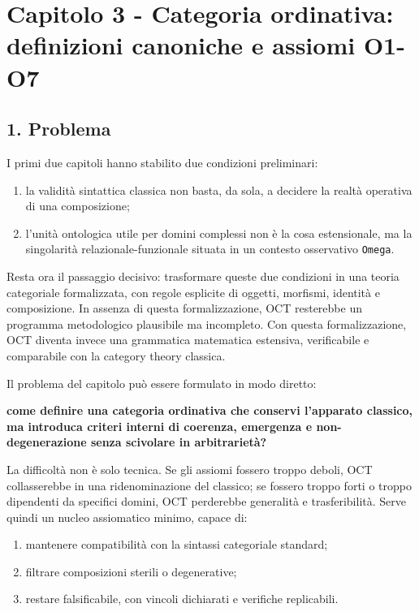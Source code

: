 \chapter{Capitolo 3 - Categoria ordinativa: definizioni canoniche e assiomi O1-O7}

\section{1. Problema}

I primi due capitoli hanno stabilito due condizioni preliminari:

\begin{enumerate}
\def\labelenumi{\arabic{enumi}.}
\tightlist
\item
  la validità sintattica classica non basta, da sola, a decidere la realtà operativa di una composizione;
\item
  l'unità ontologica utile per domini complessi non è la cosa estensionale, ma la singolarità relazionale-funzionale situata in un contesto osservativo \texttt{Omega}.
\end{enumerate}

Resta ora il passaggio decisivo: trasformare queste due condizioni in una teoria categoriale formalizzata, con regole esplicite di oggetti, morfismi, identità e composizione. In assenza di questa formalizzazione, OCT resterebbe un programma metodologico plausibile ma incompleto. Con questa formalizzazione, OCT diventa invece una grammatica matematica estensiva, verificabile e comparabile con la category theory classica.

Il problema del capitolo può essere formulato in modo diretto:

\textbf{come definire una categoria ordinativa che conservi l'apparato classico, ma introduca criteri interni di coerenza, emergenza e non-degenerazione senza scivolare in arbitrarietà?}

La difficoltà non è solo tecnica. Se gli assiomi fossero troppo deboli, OCT collasserebbe in una ridenominazione del classico; se fossero troppo forti o troppo dipendenti da specifici domini, OCT perderebbe generalità e trasferibilità. Serve quindi un nucleo assiomatico minimo, capace di:

\begin{enumerate}
\def\labelenumi{\arabic{enumi}.}
\tightlist
\item
  mantenere compatibilità con la sintassi categoriale standard;
\item
  filtrare composizioni sterili o degenerative;
\item
  restare falsificabile, con vincoli dichiarati e verifiche replicabili.
\end{enumerate}

